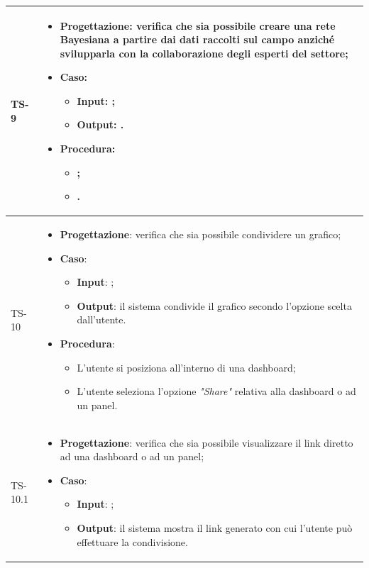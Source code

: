 \begin{longtable}{|C{2.5cm}|C{13cm}|}
	\hline
	{TS-9} &
\begin{itemize}
	\item \textbf{Progettazione}: verifica che sia  possibile creare una rete
	Bayesiana a partire dai dati raccolti sul campo anziché svilupparla con la
	collaborazione degli esperti del settore;
	\item \textbf{Caso}: 
	\begin{itemize}
		\item \textbf{Input}: ;
		\item \textbf{Output}: .
	\end{itemize}
	\item \textbf{Procedura}:
	\begin{itemize}
		\item ;
		\item .
	\end{itemize} 
\end{itemize}
	  \\
	\hline
	{TS-10} &
\begin{itemize}
	\item \textbf{Progettazione}: verifica che sia possibile condividere un
	grafico;
	\item \textbf{Caso}: 
	\begin{itemize}
		\item \textbf{Input}: ;
		\item \textbf{Output}: il sistema condivide il grafico secondo l'opzione scelta dall'utente.
	\end{itemize}
	\item \textbf{Procedura}:
	\begin{itemize}
		\item L'utente si posiziona all'interno di una dashboard;
		\item L'utente seleziona l'opzione \emph{"Share"} relativa alla dashboard o ad un panel.
	\end{itemize} 
\end{itemize}
	  \\
	\hline
	{TS-10.1} & 
\begin{itemize}
	\item \textbf{Progettazione}: verifica che sia possibile visualizzare il
	link diretto ad una dashboard o ad un panel;
	\item \textbf{Caso}: 
	\begin{itemize}
		\item \textbf{Input}: ;
		\item \textbf{Output}: il sistema mostra il link generato con cui l'utente può effettuare la condivisione.

\end{itemize}
\end{itemize}
\end{longtable}
